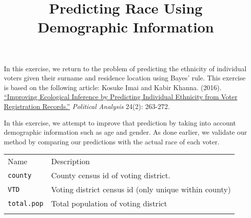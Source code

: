 \documentclass[]{article}
\title{Predicting Race Using Demographic Information}
\author{}
\date{}
\begin{document}
\maketitle


In this exercise, we return to the problem of predicting the ethnicity
of individual voters given their surname and residence location using
Bayes' rule. This exercise is based on the following article: Kosuke
Imai and Kabir Khanna. (2016).
\href{https://doi.org/10.1093/pan/mpw001}{``Improving Ecological
Inference by Predicting Individual Ethnicity from Voter Registration
Records.''} \emph{Political Analysis} 24(2): 263-272.

In this exercise, we attempt to improve that prediction by taking into
account demographic information such as age and gender. As done earlier,
we validate our method by comparing our predictions with the actual race
of each voter.

\begin{longtable}[c]{@{}ll@{}}
\toprule\addlinespace
\begin{minipage}[b]{0.24\columnwidth}\raggedright
Name
\end{minipage} & \begin{minipage}[b]{0.69\columnwidth}\raggedright
Description
\end{minipage}
\\\addlinespace
\midrule\endhead
\begin{minipage}[t]{0.24\columnwidth}\raggedright
\texttt{county}
\end{minipage} & \begin{minipage}[t]{0.69\columnwidth}\raggedright
County census id of voting district.
\end{minipage}
\\\addlinespace
\begin{minipage}[t]{0.24\columnwidth}\raggedright
\texttt{VTD}
\end{minipage} & \begin{minipage}[t]{0.69\columnwidth}\raggedright
Voting district census id (only unique within county)
\end{minipage}
\\\addlinespace
\begin{minipage}[t]{0.24\columnwidth}\raggedright
\texttt{total.pop}
\end{minipage} & \begin{minipage}[t]{0.69\columnwidth}\raggedright
Total population of voting district
\end{minipage}
\\\addlinespace
\bottomrule
\end{longtable}
\end{document}
